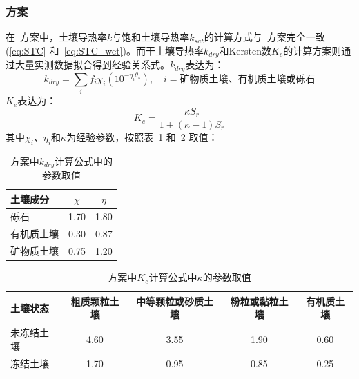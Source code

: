 \subsubsection{\citet{cote2005}方案}
在~\citet{cote2005}方案中，土壤导热率$k$与饱和土壤导热率$k_{sat}$的计算方式与~\citet{Johansen1975}方案完全一致 (\eqref{eq:STC} 和~\eqref{eq:STC_wet})。而干土壤导热率$k_{dry}$和Kersten数$K_e$的计算方案则通过大量实测数据拟合得到经验关系式。$k_{dry}$表达为：
\begin{equation}\label{eq:STC_dry_CK}
k_{dry}=\sum_if_i\chi_i(10^{-\eta_i\theta_s}),\quad i=\text{矿物质土壤、有机质土壤或砾石}
\end{equation}
$K_e$表达为：
\begin{equation}
K_e=\frac{\kappa S_r}{1+(\kappa -1)S_r}
\end{equation}
其中$\chi_i$、$\eta_i$和$\kappa$为经验参数，按照表~\ref{tab:Cote2005方案中k计算参数取值} 和~\ref{tab:Cote2005方案中k计算参数kappa取值} 取值：
\begin{table}[htbp]
    \centering
    \caption{\citet{cote2005}方案中$k_{dry}$计算公式中的参数取值}
    \label{tab:Cote2005方案中k计算参数取值}
    \begin{tabular}{@{}lcc@{}}
    \toprule
    土壤成分               & $\chi$     & $\eta$  \\
    \midrule
    砾石                  & 1.70      & 1.80  \\
    有机质土壤                  & 0.30    & 0.87   \\
    矿物质土壤         & 0.75   & 1.20    \\
    \bottomrule
    \end{tabular}
\end{table}
%
\begin{table}[htbp]
    \centering
    \caption{\citet{cote2005}方案中$K_e$计算公式中$\kappa$的参数取值}
    \label{tab:Cote2005方案中k计算参数kappa取值}
    \begin{tabular}{@{}lcccc@{}}
    \toprule
    土壤状态               & 粗质颗粒土壤     & 中等颗粒或砂质土壤 & 粉粒或黏粒土壤 & 有机质土壤  \\
    \midrule
    未冻结土壤             & 4.60      & 3.55   & 1.90    &  0.60  \\
    冻结土壤              & 1.70    & 0.95     & 0.85  & 0.25   \\
    \bottomrule
    \end{tabular}
\end{table}

